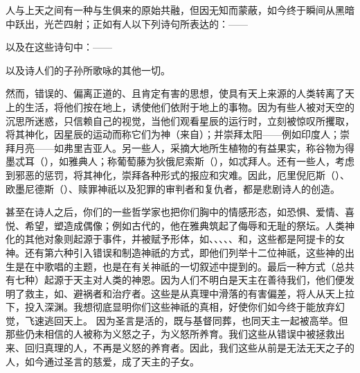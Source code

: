 人与上天之间有一种与生俱来的原始共融，但因无知而蒙蔽，如今终于瞬间从黑暗中跃出，光芒四射；正如有人以下列诗句所表达的：——\par

\par

以及在这些诗句中：——\par

\par

以及诗人们的子孙所歌咏的其他一切。\par

然而，错误的、偏离正道的、且肯定有害的思想，使具有天上来源的人类转离了天上的生活，将他们按在地上，诱使他们依附于地上的事物。因为有些人被对天空的沉思所迷惑，只信赖自己的视觉，当他们观看星辰的运行时，立刻被惊叹所攫取，将其神化，因星辰的运动而称它们为神（来自）；并崇拜太阳——例如印度人；崇拜月亮——如弗里吉亚人。另一些人，采摘大地所生植物的有益果实，称谷物为得墨忒耳（），如雅典人；称葡萄藤为狄俄尼索斯（），如忒拜人。还有一些人，考虑到邪恶的惩罚，将其神化，崇拜各种形式的报应和灾难。因此，厄里倪厄斯（）、欧墨尼德斯（）、赎罪神祇以及犯罪的审判者和复仇者，都是悲剧诗人的创造。\par

甚至在诗人之后，你们的一些哲学家也把你们胸中的情感形态，如恐惧、爱情、喜悦、希望，塑造成偶像；例如古代的，他在雅典筑起了侮辱和无耻的祭坛。人类神化的其他对象则起源于事件，并被赋予形体，如、、、、、和，这些都是阿提卡的女神。还有第六种引入错误和制造神祇的方式，即他们列举十二位神祇，这些神的出生是在中歌唱的主题，也是在有关神祇的一切叙述中提到的。最后一种方式（总共有七种）起源于天主对人类的神恩。因为人们不明白是天主在善待我们，他们便发明了救主，如、避祸者和治疗者。这些是从真理中滑落的有害偏差，将人从天上拉下，投入深渊。我想彻底显明你们这些神祇的真相，好使你们如今终于能放弃幻觉，飞速逃回天上。  因为圣言是活的，既与基督同葬，也同天主一起被高举。但那些仍未相信的人被称为义怒之子，为义怒所养育。我们这些从错误中被拯救出来、回归真理的人，不再是义怒的养育者。因此，我们这些从前是无法无天之子的人，如今通过圣言的慈爱，成了天主的子女。\par

